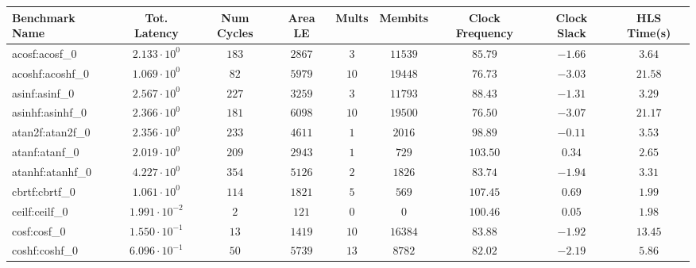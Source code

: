 \begin{tabular}{|l|c|c|c|c|c|c|c|c|}
\hline
Benchmark Name               & Tot. Latency            & Num Cycles & Area LE   & Mults   & Membits    & Clock Frequency & Clock Slack & HLS Time(s) \\
\hline
acosf:acosf\_0               & $ 2.133 \cdot 10^{0}  $ & $ 183    $ & $ 2867  $ & $ 3   $ & $ 11539  $ & $ 85.79       $ & $ -1.66   $ & $ 3.64    $ \\
acoshf:acoshf\_0             & $ 1.069 \cdot 10^{0}  $ & $ 82     $ & $ 5979  $ & $ 10  $ & $ 19448  $ & $ 76.73       $ & $ -3.03   $ & $ 21.58   $ \\
asinf:asinf\_0               & $ 2.567 \cdot 10^{0}  $ & $ 227    $ & $ 3259  $ & $ 3   $ & $ 11793  $ & $ 88.43       $ & $ -1.31   $ & $ 3.29    $ \\
asinhf:asinhf\_0             & $ 2.366 \cdot 10^{0}  $ & $ 181    $ & $ 6098  $ & $ 10  $ & $ 19500  $ & $ 76.50       $ & $ -3.07   $ & $ 21.17   $ \\
atan2f:atan2f\_0             & $ 2.356 \cdot 10^{0}  $ & $ 233    $ & $ 4611  $ & $ 1   $ & $ 2016   $ & $ 98.89       $ & $ -0.11   $ & $ 3.53    $ \\
atanf:atanf\_0               & $ 2.019 \cdot 10^{0}  $ & $ 209    $ & $ 2943  $ & $ 1   $ & $ 729    $ & $ 103.50      $ & $ 0.34    $ & $ 2.65    $ \\
atanhf:atanhf\_0             & $ 4.227 \cdot 10^{0}  $ & $ 354    $ & $ 5126  $ & $ 2   $ & $ 1826   $ & $ 83.74       $ & $ -1.94   $ & $ 3.31    $ \\
cbrtf:cbrtf\_0               & $ 1.061 \cdot 10^{0}  $ & $ 114    $ & $ 1821  $ & $ 5   $ & $ 569    $ & $ 107.45      $ & $ 0.69    $ & $ 1.99    $ \\
ceilf:ceilf\_0               & $ 1.991 \cdot 10^{-2} $ & $ 2      $ & $ 121   $ & $ 0   $ & $ 0      $ & $ 100.46      $ & $ 0.05    $ & $ 1.98    $ \\
cosf:cosf\_0                 & $ 1.550 \cdot 10^{-1} $ & $ 13     $ & $ 1419  $ & $ 10  $ & $ 16384  $ & $ 83.88       $ & $ -1.92   $ & $ 13.45   $ \\
coshf:coshf\_0               & $ 6.096 \cdot 10^{-1} $ & $ 50     $ & $ 5739  $ & $ 13  $ & $ 8782   $ & $ 82.02       $ & $ -2.19   $ & $ 5.86    $ \\

\end{tabular}
